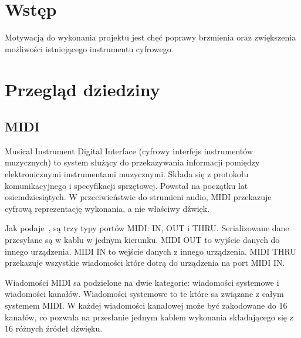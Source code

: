 \documentclass[11pt]{report}
\begin{document}
    \begin{titlepage}
        \centering
        \vspace{0.05\textheight}
        \vspace{0.06\textheight}
        \vspace{0.5\textheight}
        \vspace{0.03\textheight}
    \end{titlepage}

    \tableofcontents


    \chapter{Wstęp}\label{ch:wstęp}
    Motywacją do wykonania projektu jest chęć poprawy brzmienia oraz zwiększenia możliwości istniejącego instrumentu cyfrowego.


    \chapter{Przegląd dziedziny}


    \section{MIDI}
    Musical Instrument Digital Interface (cyfrowy interfejs instrumentów muzycznych) to system służący do przekazywania informacji pomiędzy elektronicznymi instrumentami muzycznymi.
    Składa się z protokołu komunikacyjnego i specyfikacji sprzętowej.
    Powstał na początku lat osiemdziesiątych.
    W przeciwieństwie do strumieni audio, MIDI przekazuje cyfrową reprezentację wykonania, a nie właściwy dźwięk.

    Jak podaje~\cite{122929520160101}, są trzy typy portów MIDI: IN, OUT i THRU.
    Serializowane dane przesyłane są w kablu w jednym kierunku.
    MIDI OUT to wyjście danych do innego urządzenia.
    MIDI IN to wejście danych z innego urządzenia.
    MIDI THRU przekazuje wszystkie wiadomości które dotrą do urządzenia na port MIDI IN.

    Wiadomości MIDI sa podzielone na dwie kategorie: wiadomości systemowe i wiadomości kanałów.
    Wiadomości systemowe to te które sa związane z całym systemem MIDI.
    W każdej wiadomości kanałowej może być zakodowane do 16 kanałów, co pozwala na przesłanie jednym kablem wykonania składającego się z 16 różnych źródeł dźwięku.
\end{document}
